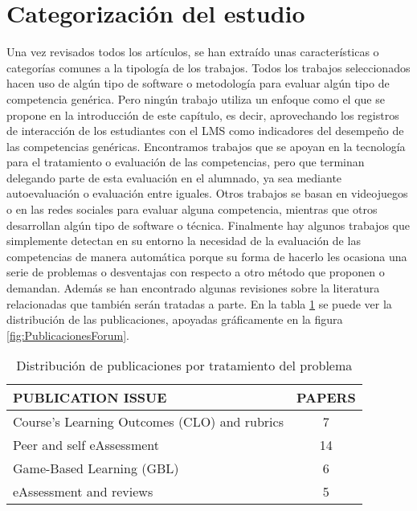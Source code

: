 \section{Categorización del estudio}

Una vez revisados todos los artículos, se han extraído unas características o categorías comunes a la tipología de los trabajos. Todos los trabajos seleccionados hacen uso de algún tipo de software o metodología para evaluar algún tipo de competencia genérica. Pero ningún trabajo utiliza un enfoque como el que se propone en la introducción de este capítulo, es decir, aprovechando los registros de interacción de los estudiantes con el LMS como indicadores del desempeño de las competencias genéricas. Encontramos trabajos que se apoyan en la tecnología para el tratamiento o evaluación de las competencias, pero que terminan delegando parte de esta evaluación en el alumnado, ya sea mediante autoevaluación o evaluación entre iguales. Otros trabajos se basan en videojuegos o en las redes sociales para evaluar alguna competencia, mientras que otros desarrollan algún tipo de software o técnica. Finalmente hay algunos trabajos que simplemente detectan en su entorno la necesidad de la evaluación de las competencias de manera automática porque su forma de hacerlo les ocasiona una serie de problemas o desventajas con respecto a otro método que proponen o demandan. Además se han encontrado algunas revisiones sobre la literatura relacionadas que también serán tratadas a parte.  En la tabla \ref{tab:PublicacionesForum} se puede ver la distribución de las publicaciones, apoyadas gráficamente en la figura  \ref{fig:PublicacionesForum}. 

\begin{table}[H]
  \begin{center}
  \begin{tabular}{| m{10cm} | c |}
    \hline
    PUBLICATION ISSUE & PAPERS\\
    \hline
    \hline 
    Course’s Learning Outcomes (CLO) and rubrics & 7\\
    \hline
    Peer and self eAssessment & 14\\
    \hline
    Game-Based Learning (GBL) & 6\\
    \hline
    eAssessment and reviews & 5\\
    \hline
  \end{tabular}
\end{center}
\caption{Distribución de publicaciones por tratamiento del problema}
\label{tab:PublicacionesForum}
\end{table} 

